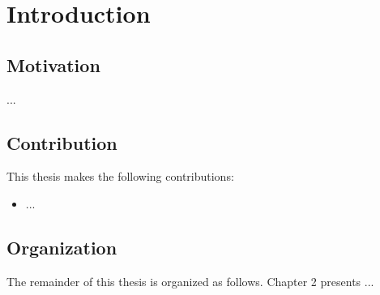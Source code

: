 \chapter{Introduction}
\section{Motivation}

...


\section{Contribution}
This thesis makes the following contributions:
\begin{itemize} 
\item
...

\end{itemize}

\section{Organization}
The remainder of this thesis is organized as follows. Chapter 2 presents ...

